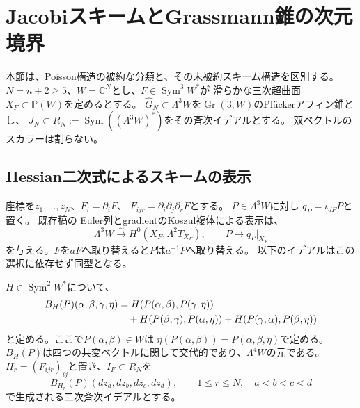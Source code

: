 \section{JacobiスキームとGrassmann錐の次元境界}
\label{sec:nfold-jacobi-scheme}

本節は、Poisson構造の被約な分類と、その未被約スキーム構造を区別する。
$N=n+2\ge5$、$W=\mathbb C^N$とし、$F\in\operatorname{Sym}^3W^*$が
滑らかな三次超曲面$X_F\subset\mathbb P(W)$を定めるとする。
$\widehat{G}_N\subset\Lambda^3W$を$\operatorname{Gr}(3,W)$のPl\"uckerアフィン錐とし、
$J_N\subset R_N:=\operatorname{Sym}((\Lambda^3W)^*)$をその斉次イデアルとする。
双ベクトルのスカラーは割らない。

\subsection{Hessian二次式によるスキームの表示}
座標を$z_1,\ldots,z_N$、$F_i=\partial_iF$、
$F_{ijr}=\partial_i\partial_j\partial_rF$とする。
$P\in\Lambda^3W$に対し
$q_P=\iota_{dF}P$と置く。
既存稿\cite[命題\texttt{prop:pg-represent}]{NCCubicA}の
Euler列とgradientのKoszul複体による表示は、
\begin{equation}\label{eq:nfold-bivector}
 \Lambda^3W\xrightarrow{\sim}H^0(X_F,\Lambda^2T_{X_F}),
 \qquad P\longmapsto q_P|_{X_F}
\end{equation}
を与える。$F$を$aF$へ取り替えると$P$は$a^{-1}P$へ取り替える。
以下のイデアルはこの選択に依存せず同型となる。

$H\in\operatorname{Sym}^2W^*$について、
\begin{align}\label{eq:nfold-hessian-B}
 B_H(P)(\alpha,\beta,\gamma,\eta)
 &=H(P(\alpha,\beta),P(\gamma,\eta))\notag\\
 &\quad+H(P(\beta,\gamma),P(\alpha,\eta))
       +H(P(\gamma,\alpha),P(\beta,\eta))
\end{align}
と定める。ここで$P(\alpha,\beta)\in W$は
$\eta(P(\alpha,\beta))=P(\alpha,\beta,\eta)$で定める。
$B_H(P)$は四つの共変ベクトルに関して交代的であり、$\Lambda^4W$の元である。
$H_r=(F_{ijr})_{ij}$と置き、$I_F\subset R_N$を
\begin{equation}\label{eq:nfold-jacobi-quadrics}
 B_{H_r}(P)(dz_a,dz_b,dz_c,dz_d),
 \qquad 1\le r\le N,\quad a<b<c<d
\end{equation}
で生成される二次斉次イデアルとする。


